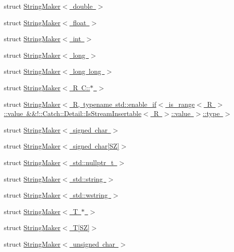 \begin{DoxyCompactItemize}
\item 
struct \mbox{\hyperlink{struct_catch_1_1_string_maker_3_01double_01_4}{String\+Maker$<$ double $>$}}
\item 
struct \mbox{\hyperlink{struct_catch_1_1_string_maker_3_01float_01_4}{String\+Maker$<$ float $>$}}
\item 
struct \mbox{\hyperlink{struct_catch_1_1_string_maker_3_01int_01_4}{String\+Maker$<$ int $>$}}
\item 
struct \mbox{\hyperlink{struct_catch_1_1_string_maker_3_01long_01_4}{String\+Maker$<$ long $>$}}
\item 
struct \mbox{\hyperlink{struct_catch_1_1_string_maker_3_01long_01long_01_4}{String\+Maker$<$ long long $>$}}
\item 
struct \mbox{\hyperlink{struct_catch_1_1_string_maker_3_01_r_01_c_1_1_5_01_4}{String\+Maker$<$ R C\+::$\ast$ $>$}}
\item 
struct \mbox{\hyperlink{struct_catch_1_1_string_maker_3_01_r_00_01typename_01std_1_1enable__if_3_01is__range_3_01_r_01_4536d8fedfff6d62432b3dc59b56e1380}{String\+Maker$<$ R, typename std\+::enable\+\_\+if$<$ is\+\_\+range$<$ R $>$\+::value \&\&!\+::\+Catch\+::\+Detail\+::\+Is\+Stream\+Insertable$<$ R $>$\+::value $>$\+::type $>$}}
\item 
struct \mbox{\hyperlink{struct_catch_1_1_string_maker_3_01signed_01char_01_4}{String\+Maker$<$ signed char $>$}}
\item 
struct \mbox{\hyperlink{struct_catch_1_1_string_maker_3_01signed_01char[_s_z]_4}{String\+Maker$<$ signed char\mbox{[}\+S\+Z\mbox{]}$>$}}
\item 
struct \mbox{\hyperlink{struct_catch_1_1_string_maker_3_01std_1_1nullptr__t_01_4}{String\+Maker$<$ std\+::nullptr\+\_\+t $>$}}
\item 
struct \mbox{\hyperlink{struct_catch_1_1_string_maker_3_01std_1_1string_01_4}{String\+Maker$<$ std\+::string $>$}}
\item 
struct \mbox{\hyperlink{struct_catch_1_1_string_maker_3_01std_1_1wstring_01_4}{String\+Maker$<$ std\+::wstring $>$}}
\item 
struct \mbox{\hyperlink{struct_catch_1_1_string_maker_3_01_t_01_5_01_4}{String\+Maker$<$ T $\ast$ $>$}}
\item 
struct \mbox{\hyperlink{struct_catch_1_1_string_maker_3_01_t[_s_z]_4}{String\+Maker$<$ T\mbox{[}\+S\+Z\mbox{]}$>$}}
\item 
struct \mbox{\hyperlink{struct_catch_1_1_string_maker_3_01unsigned_01char_01_4}{String\+Maker$<$ unsigned char $>$}}

\end{DoxyCompactItemize}
